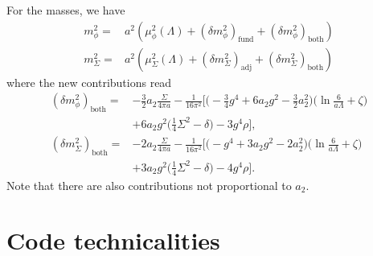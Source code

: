 \documentclass[11pt,a4paper]{article}
\begin{document}
For the masses, we have 
\begin{align}
m^2_\phi =& a^2(\mu^2_\phi(\Lambda) + (\delta m^2_\phi)_\text{fund}+ (\delta m^2_\phi)_\text{both} )\\
m^2_\Sigma =& a^2( \mu^2_\Sigma(\Lambda) + (\delta m^2_\Sigma)_\text{adj} + (\delta m^2_\Sigma)_\text{both} ) 
\end{align}
where the new contributions read
\begin{align}
(\delta m^2_\phi)_\text{both} =& -\frac32 a_2 \frac{\Sigma}{4\pi a} - \frac{1}{16\pi^2} \Big[ \Big( -\frac34 g^4 + 6 a_2 g^2 - \frac32 a_2^2  \Big)\Big( \ln \frac{6}{a\Lambda}+\zeta \Big) \nonumber \\ 
& + 6 a_2 g^2 \Big( \frac14 \Sigma^2 - \delta \Big) - 3g^4 \rho \Big], \\
%
(\delta m^2_\Sigma)_\text{both} =& -2 a_2 \frac{\Sigma}{4\pi a} - \frac{1}{16\pi^2}\Big[ \Big( -g^4 + 3 a_2 g^2 - 2 a_2^2 \Big)\Big( \ln\frac{6}{a \Lambda} + \zeta \Big) \nonumber \\
&+ 3 a_2 g^2 \Big( \frac14 \Sigma^2 - \delta \Big) - 4 g^4 \rho \Big].
\end{align}
Note that there are also contributions not proportional to $a_2$.


\section{Code technicalities}
\end{document}
